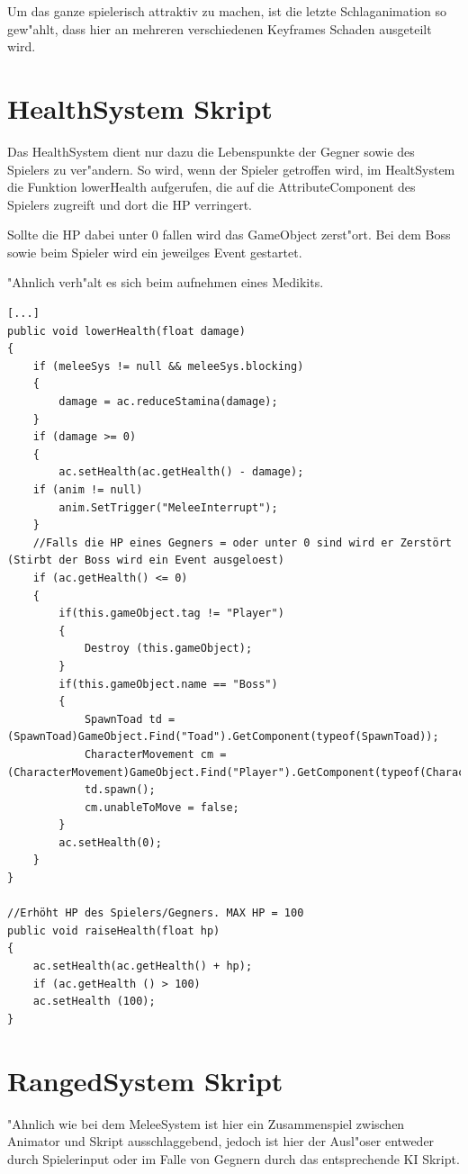 Um das ganze spielerisch attraktiv zu machen, ist die letzte Schlaganimation so gew"ahlt, dass hier an mehreren verschiedenen Keyframes Schaden ausgeteilt wird.


\section{HealthSystem Skript}


Das HealthSystem dient nur dazu die Lebenspunkte der Gegner sowie des Spielers zu ver"andern. So wird, wenn der Spieler getroffen wird, im HealtSystem die Funktion lowerHealth aufgerufen, die auf die AttributeComponent des Spielers zugreift und dort die HP verringert.

Sollte die HP dabei unter 0 fallen wird das GameObject zerst"ort. Bei dem Boss sowie beim Spieler wird ein jeweilges Event gestartet.

"Ahnlich verh"alt es sich beim aufnehmen eines Medikits.

\begin{lstlisting}[breakline = true]
[...]
public void lowerHealth(float damage)
{
	if (meleeSys != null && meleeSys.blocking)
	{
		damage = ac.reduceStamina(damage);
	}
	if (damage >= 0)
	{
		ac.setHealth(ac.getHealth() - damage);
	if (anim != null)
		anim.SetTrigger("MeleeInterrupt");
	}
	//Falls die HP eines Gegners = oder unter 0 sind wird er Zerstört (Stirbt der Boss wird ein Event ausgeloest)
	if (ac.getHealth() <= 0)
	{
		if(this.gameObject.tag != "Player")
		{
			Destroy (this.gameObject);
		}
		if(this.gameObject.name == "Boss")
		{
			SpawnToad td = (SpawnToad)GameObject.Find("Toad").GetComponent(typeof(SpawnToad));
			CharacterMovement cm = (CharacterMovement)GameObject.Find("Player").GetComponent(typeof(CharacterMovement));
			td.spawn();
			cm.unableToMove = false;
		}
		ac.setHealth(0);
	}
}

//Erhöht HP des Spielers/Gegners. MAX HP = 100
public void raiseHealth(float hp)
{
	ac.setHealth(ac.getHealth() + hp);
	if (ac.getHealth () > 100)
	ac.setHealth (100);
}
\end{lstlisting}

\section{RangedSystem Skript}
"Ahnlich wie bei dem MeleeSystem ist hier ein Zusammenspiel zwischen Animator und Skript ausschlaggebend, jedoch ist hier der Ausl"oser entweder durch Spielerinput oder im Falle von Gegnern durch das entsprechende KI Skript.\newline

